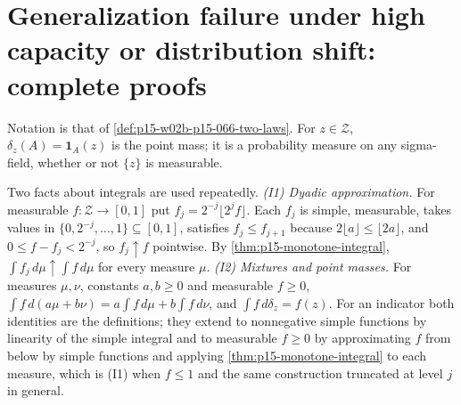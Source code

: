 \section{Generalization failure under high capacity or distribution shift: complete proofs}
\label{sec:annex-p15-w02b-p15-066}

Notation is that of \cref{def:p15-w02b-p15-066-two-laws}. For
\(z\in\mathcal Z\), \(\delta_z(A)=\mathbf1_A(z)\) is
the point mass; it is a probability measure on any sigma-field, whether
or not \(\{z\}\) is measurable.

Two facts about integrals are used repeatedly.
\emph{(I1) Dyadic approximation.} For measurable \(f:\mathcal Z\to[0,1]\)
put \(f_j=2^{-j}\lfloor2^jf\rfloor\). Each \(f_j\) is simple, measurable,
takes values in \(\{0,2^{-j},\ldots,1\}\subseteq[0,1]\), satisfies
\(f_j\leq f_{j+1}\) because \(2\lfloor a\rfloor\leq\lfloor2a\rfloor\),
and \(0\leq f-f_j<2^{-j}\), so \(f_j\uparrow f\) pointwise. By
\cref{thm:p15-monotone-integral}, \(\int f_j\,d\mu\uparrow\int f\,d\mu\)
for every measure \(\mu\).
\emph{(I2) Mixtures and point masses.} For measures
\(\mu,\nu\), constants \(a,b\geq0\) and measurable \(f\geq0\),
\(\int f\,d(a\mu+b\nu)=a\int f\,d\mu+b\int f\,d\nu\), and
\(\int f\,d\delta_z=f(z)\). For an indicator both identities are the
definitions; they extend to nonnegative simple functions by linearity of
the simple integral and to measurable \(f\geq0\) by approximating
\(f\) from below by simple functions and applying
\cref{thm:p15-monotone-integral} to each measure, which is (I1) when
\(f\leq1\) and the same construction truncated at level \(j\) in general.

